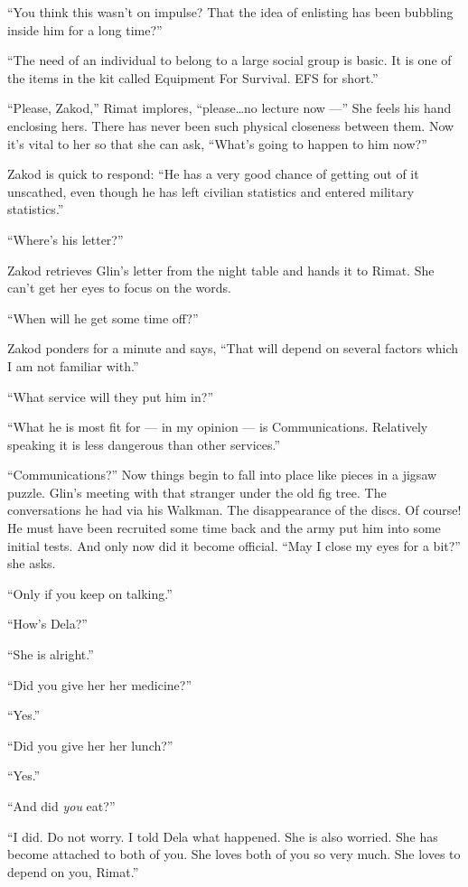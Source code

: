 \documentclass[twoside,11pt,openany]{book}
\begin{document}
``You think this wasn't on impulse? That the idea of enlisting has been bubbling inside him for a long
time?''

``The need of an individual to belong to a large social group is basic. It is one of the items in the kit
called Equipment For Survival. EFS for short.''

``Please, Zakod,'' Rimat implores, ``please{\ldots}no lecture now ---'' She feels his hand enclosing hers. There has
never been such physical closeness between them. Now it's vital to her so that she can ask,
``What's going to happen to him now?''

Zakod is quick to respond: ``He has a very good chance of getting out of it unscathed, even though he has
left civilian statistics and entered military statistics.''

``Where's his letter?''

Zakod retrieves Glin's letter from the night table and hands it to Rimat. She can't get her eyes to focus on the
words.

 ``When will he get some time off?''

Zakod ponders for a minute and says, ``That will depend on several factors which I am not familiar with.''

``What service will they put him in?{}''

``What he is most fit for --- in my opinion --- is Communications. Relatively speaking it is less dangerous than other
services.''

``Communications?'' Now things begin to fall into place like pieces in a jigsaw puzzle. Glin's meeting with that
stranger under the old fig tree. The conversations he had via his Walkman. The disappearance of the discs. Of course!
He must have been recruited some time back and the army put him into some initial tests. And only now did it become
official. ``May I close my eyes for a bit?'' she asks.

``Only if you keep on talking.''

``How's Dela?''

``She is alright.''

``Did you give her her medicine?''

``Yes.''

``Did you give her{ }her lunch?''

``Yes.''

``And did \textit{you} eat?''

``I did. Do not worry. I told Dela what happened. She is also worried.  She has become attached to both of you. She
loves both of you so very much. She loves to depend on you, Rimat.{}''
\end{document}
